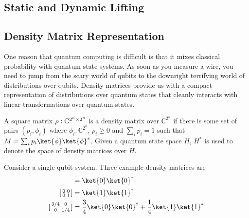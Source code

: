 \subsection{Static and Dynamic Lifting}

\subsection{Density Matrix Representation}%
One reason that quantum computing is difficult is that it mixes classical probability with quantum state systems.
As soon as you measure a wire, you need to jump from the scary world of qubits to the downright terrifying world of distributions over qubits.
Density matrices provide us with a compact representation of distributions over quantum states that cleanly interacts with linear transformations over quantum states.
\begin{definition}
A square matrix $\rho : \mathbb{C}^{2^n\times 2^n}$ is a density matrix over $\mathbb{C}^{2^n}$ if there is some set of pairs $(p_i,\phi_i)$ where $\phi_i: \mathbb{C}^{2^n}$, $p_i\geq 0$ and $\sum_{i}p_i=1$ such that
$M=\sum_{i}p_i\ket{\phi}\ket{\phi}^*$. Given a quantum state space $H$, $H^*$ is used to denote the space of density matrices over $H$.
\end{definition}
Consider a single qubit system. Three example density matrices are
\begin{align}
[\begin{smallmatrix} 1 & 0 \\ 0 & 0 \end{smallmatrix}]&= \ket{0}\ket{0}^\dagger\\
 [\begin{smallmatrix} 0 & 0 \\ 0 & 1 \end{smallmatrix}]&= \ket{1}\ket{1}^\dagger\\
 [\begin{smallmatrix} 3/4 & 0 \\ 0 & 1/4 \end{smallmatrix}]&= \frac{3}{4}\ket{0}\ket{0}^\dagger + \frac{1}{4}\ket{1}\ket{1}^*
\end{align}

